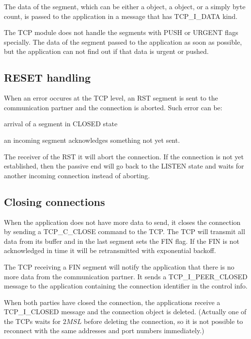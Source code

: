 The data of the segment, which can be either a 
object, a  object, or a simply byte count,
is passed to the application in a message that has
TCP\_I\_DATA kind.


\begin{note}
The TCP module does not handle the segments with PUSH or URGENT
flags specially. The data of the segment passed to the application
as soon as possible, but the application can not find out if that
data is urgent or pushed.
\end{note}

\subsection{RESET handling}

When an error occures at the TCP level, an RST segment is sent to
the communication partner and the connection is aborted.
Such error can be:
\begin{compactitem}
  \item arrival of a segment in CLOSED state
  \item an incoming segment acknowledges something not yet sent.
\end{compactitem}

The receiver of the RST it will abort the connection.
If the connection is not yet established, then the passive
end will go back to the LISTEN state and waits for another
incoming connection instead of aborting.    

\subsection{Closing connections}

When the application does not have more data to send, it closes the
connection by sending a TCP\_C\_CLOSE command to the TCP. The TCP
will transmit all data from its buffer and in the last segment sets
the FIN flag. If the FIN is not acknowledged in time it will be
retransmitted with exponential backoff.

The TCP receiving a FIN segment will notify the application that
there is no more data from the communication partner. It sends
a TCP\_I\_PEER\_CLOSED message to the application containing
the connection identifier in the control info.

When both parties have closed the connection, the applications
receive a TCP\_I\_CLOSED message and the connection object is
deleted. (Actually one of the TCPs waits for $2 MSL$ before
deleting the connection, so it is not possible to reconnect
with the same addresses and port numbers immediately.)

